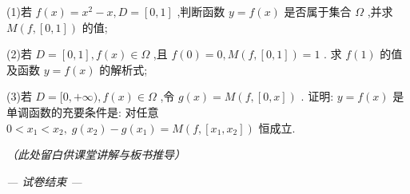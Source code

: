\documentclass[10pt]{article}
\newcommand{\largeboardspace}{%
  \par\vspace{8cm}
  \hfill\textit{（此处留白供课堂讲解与板书推导）}
  \par\vspace{1cm}
}
\begin{document}
(1)若 \(f\left( x\right)  = {x}^{2} - x,D = \left\lbrack  {0,1}\right\rbrack\) ,判断函数 \(y = f\left( x\right)\) 是否属于集合 \(\Omega\) ,并求 \(M\left( {f,\left\lbrack  {0,1}\right\rbrack  }\right)\) 的值;

(2)若 \(D = \left\lbrack  {0,1}\right\rbrack  ,f\left( x\right)  \in  \Omega\) ,且 \(f\left( 0\right)  = 0,M\left( {f,\left\lbrack  {0,1}\right\rbrack  }\right)  = 1\) . 求 \(f\left( 1\right)\) 的值及函数 \(y = f\left( x\right)\) 的解析式;

(3)若 \(D = \lbrack 0, + \infty ),f\left( x\right)  \in  \Omega\) ,令 \(g\left( x\right)  = M\left( {f,\left\lbrack  {0,x}\right\rbrack  }\right)\) . 证明: \(y = f\left( x\right)\) 是单调函数的充要条件是: 对任意 \(0 < {x}_{1} < {x}_{2},\;g\left( {x}_{2}\right)  - g\left( {x}_{1}\right)  = M\left( {f,\left\lbrack  {{x}_{1},{x}_{2}}\right\rbrack  }\right)\) 恒成立.

\largeboardspace

\vfill
\begin{center}
\textit{— 试卷结束 —}
\end{center}
\end{document}
